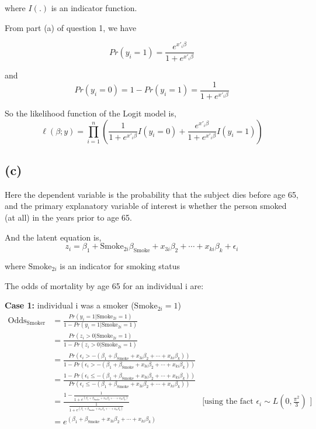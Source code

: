 \documentclass[a4paper]{article}
\begin{document}
where $I(.)$ is an indicator function.

From part (a) of question 1, we have 

\[
    Pr(y_{i}=1) = \frac{e^{x'_{i}\beta}}{ 1+ e^{x'_{i}\beta}}
\]  

and 
\[
    Pr(y_{i}=0) = 1 - Pr(y_{i} = 1) =\frac{1}{ 1+ e^{x'_{i}\beta}}
\] 

So the likelihood function of the Logit model is,
\[
    \ell (\beta;y) = \prod_{i=1}^{n}  ( \frac{1}{ 1+ e^{x'_{i}\beta}}I(y_{i} = 0) + \frac{e^{x'_{i}\beta}}{ 1+ e^{x'_{i}\beta}}I(y_{i} = 1) )
\]

\subsection*{(c)}

Here the dependent variable is the probability that the subject dies before age 65, and the primary explanatory variable of interest is whether the person smoked (at all) in the years prior to age 65.

And the latent equation is, 
\[ 
    z_{i}  = \beta_{1} + \text{Smoke}_{2i}\beta_{\text{Smoke}} + x_{3i}\beta_{2} + \cdots + x_{ki}\beta_{k} + \epsilon_{i}
\]

where $\text{Smoke}_{2i}$ is an indicator for smoking status 

\vspace{4pt}
The odds of mortality by age 65 for an individual i are:

\vspace{4pt}
\textbf{Case 1:} individual i was a smoker (\(\text{Smoke}_{2i} = 1\))
\begin{align*}
    \text{Odds}_{\text{Smoker}} &= \frac{Pr(y_{i} = 1 | \text{Smoke}_{2i}=1)}{1-Pr(y_{i} = 1 | \text{Smoke}_{2i}=1)}\\
     &= \frac{Pr(z_{i} > 0 | \text{Smoke}_{2i}=1)}{1-Pr(z_{i} > 0 | \text{Smoke}_{2i}=1)} \\
    &= \frac{Pr(\epsilon_{i} > - (\beta_{1} + \beta_{\text{Smoke}} + x_{3i}\beta_{2} + \cdots + x_{ki}\beta_{k}))}{1-Pr(\epsilon_{i} > - (\beta_{1} + \beta_{\text{Smoke}} + x_{3i}\beta_{2} + \cdots + x_{ki}\beta_{k}))} \\
    &= \frac{1-Pr(\epsilon_{i} \leq - (\beta_{1} + \beta_{\text{Smoke}} + x_{3i}\beta_{2} + \cdots + x_{ki}\beta_{k}))}{Pr(\epsilon_{i} \leq - (\beta_{1} + \beta_{\text{Smoke}} + x_{3i}\beta_{2} + \cdots + x_{ki}\beta_{k}))} \\
    &= \frac{1 - \frac{1}{1+e^{(\beta_{1} + \beta_{\text{Smoke}} + x_{3i}\beta_{2} + \cdots + x_{ki}\beta_{k})}}}{\frac{1}{1+e^{(\beta_{1} + \beta_{\text{Smoke}} + x_{3i}\beta_{2} + \cdots + x_{ki}\beta_{k})}}} & \text{[using the fact $\epsilon_{i} \sim L(0, \frac{\pi^2}{3})$ ]}\\
    &= e^{(\beta_{1} + \beta_{\text{Smoke}} + x_{3i}\beta_{2} + \cdots + x_{ki}\beta_{k})}
\end{align*}
\end{document}
